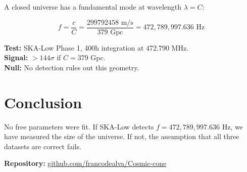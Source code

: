 \documentclass[10pt,twocolumn]{article}
\begin{document}
A closed universe has a fundamental mode at wavelength $\lambda = C$:

\begin{equation}
f = \frac{c}{C} = \frac{299792458 \text{ m/s}}{379 \text{ Gpc}} = 472,789,997.636 \text{ Hz}
\end{equation}

\textbf{Test:} SKA-Low Phase 1, 400h integration at 472.790 MHz. \\
\textbf{Signal:} $>144\sigma$ if $C = 379$ Gpc. \\
\textbf{Null:} No detection rules out this geometry.

\section{Conclusion}

No free parameters were fit. If SKA-Low detects $f = 472,789,997.636$ Hz, we have measured the size of the universe. If not, the assumption that all three datasets are correct fails. 

\textbf{Repository:} \href{https://github.com/francodealva/Cosmic-cone}{github.com/francodealva/Cosmic-cone}
\end{document}
